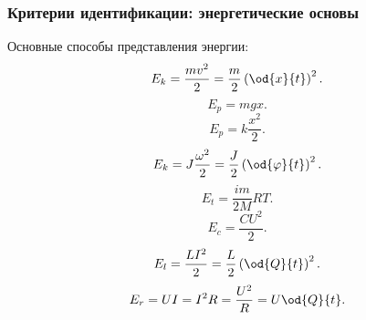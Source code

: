 \documentclass[10pt,utf8]{beamer}
\begin{document}
\begin{frame}
  \frametitle{Критерии идентификации: энергетические основы}

Основные способы представления энергии:
%
\begin{equation}
  E_k = \frac{mv^2}{2} = \frac{m}{2} \left( \od{x}{t} \right)^2.
  \label{atu:eq:Ek_v}
\end{equation}
%
%
\begin{equation}
  E_p = m g x .
  \label{atu:eq:Ep_g}
\end{equation}
%
\begin{equation}
  E_p = k \frac{x^2}{2} .
  \label{atu:eq:Ep_spring}
\end{equation}
%
\begin{equation}
  E_k = J \frac{\omega^2}{2} = \frac{J}{2} \left( \od{\varphi}{t} \right)^2 .
  \label{atu:eq:Ek_spin}
\end{equation}
%
\begin{equation}
  E_t = \frac{im}{2M} RT.
  \label{atu:eq:Et}
\end{equation}
%
\begin{equation}
  E_c = \frac{C U^2}{2}.
  \label{atu:eq:Ec}
\end{equation}
%
\begin{equation}
  E_l = \frac{L I^2}{2} = \frac{L}{2} \left( \od{Q}{t}\right)^2 .
  \label{atu:eq:El}
\end{equation}
%
\begin{equation}
  E_r = U I = I^2 R = \frac{U^2}{R} = U \od{Q}{t} .
  \label{atu:eq:Er}
\end{equation}

\end{frame}



\end{document}
